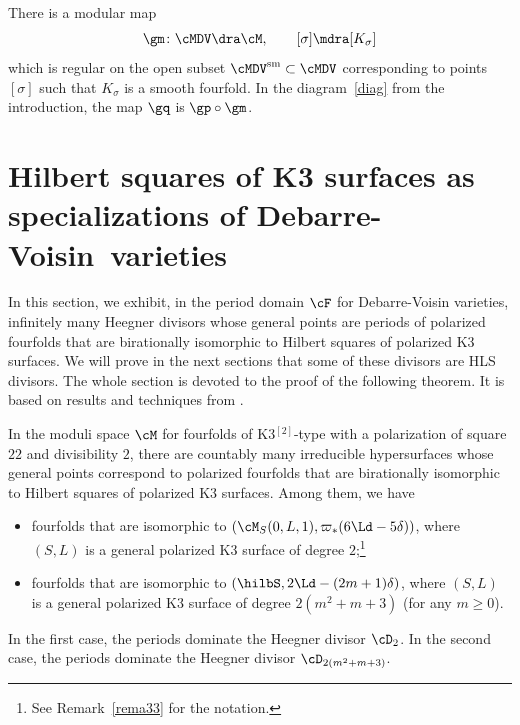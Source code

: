 There is a modular map
\[
\gm\colon \cMDV \dra \cM,\qquad [\sigma]\mdra [K_\sigma]
\]
which is regular on the open subset $\cMDV^{\textnormal{sm}}\subset \cMDV$ corresponding to points $[\sigma]$ such that $K_{\sigma}$ is a smooth fourfold. In the diagram~\eqref{diag} from the introduction, the map $\gq$ is $\gp\circ\gm$.

\section{Hilbert squares of K3 surfaces as specializations of \texorpdfstring{\hbox{Debarre-Voisin varieties}}{DBVV}}\label{secrappelonpic}

In this section, we exhibit, in the period domain $\cF$ for Debarre-Voisin varieties, infinitely many Heegner divisors whose general points are periods of polarized \hk fourfolds that are birationally isomorphic to Hilbert squares of polarized K3 surfaces. We will prove in the next sections that some of these divisors are HLS divisors. The whole section is devoted to the proof of the following theorem. It is based on results and techniques from \cite{bama, dm, hast2}.

\begin{theo}\label{th31}
In the moduli space $\cM$ for \hk fourfolds of K3$^{[2]}$-type with a polarization of square $22$ and divisibility $2$, there are countably many irreducible hypersurfaces whose general points correspond to polarized \hk fourfolds that are birationally isomorphic to Hilbert squares of polarized K3 surfaces. Among them, we have
\begin{itemize}
\item fourfolds that are isomorphic to $(\cM_S(0,L,1),\varpi_*(6\Ld-5\delta ))$, where $(S,L)$ is a general polarized K3 surface of degree $2$;\footnote{See Remark~\ref{rema33} for the notation.}
\item fourfolds that are isomorphic to $(\hilbS, 2\Ld-(2m+1)\delta)$, where $(S,L)$ is a general polarized K3 surface of degree $2(m^2+m+3)$ (for any $m\ge 0$).
\end{itemize}
In the first case, the periods dominate the Heegner divisor
$\cD_{2 }$. In the second case, the periods dominate the Heegner divisor
$\cD_{2(m^2+m+3)}$.
\end{theo}

